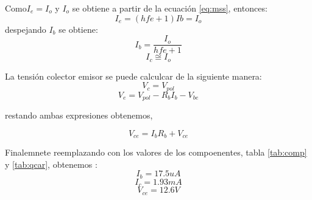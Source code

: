 \documentclass[../../main.tex]{subfiles}
\begin{document}
Como$ I_e=I_o $ y $ I_o $ se obtiene a partir de la ecuación \ref{eq:mss}, entonces:
\begin{equation}
I_e=\left( hfe +1 \right)  Ib=I_o
\end{equation}
despejando $I_b$ se obtiene:
\begin{equation}
I_b=\frac{I_o}{hfe+1}
\end{equation}
\begin{equation}
I_{c}\cong I_o
\end{equation}

La tensión colector emisor se puede calculcar de la siguiente manera:
\begin{equation}
V_c=V_{pol}
\end{equation}
\begin{equation}
V_e=V_{pol} - R_b I_b - V_{be}
\end{equation}

restando ambas expresiones obtenemos,

\begin{equation}
V_{ce}=I_b R_b + V_{ce}
\end{equation}

Finalemnete reemplazando con los valores de los compoenentes, tabla \ref{tab:comp} y \ref{tab:qcar}, obtenemos :
$$I_b=17.5uA $$
$$I_c=1.93 mA $$
$$V_{ce}=12.6V $$
\end{document}
